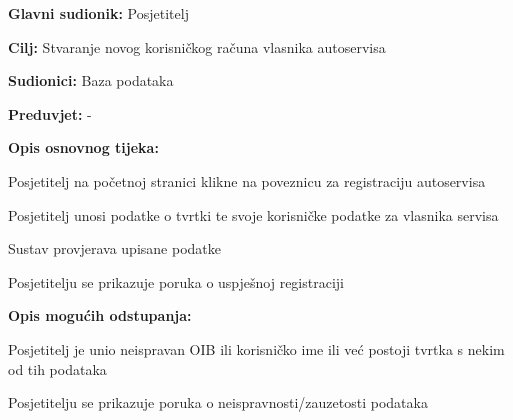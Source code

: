 					\noindent {}
					\begin{packed_item}
						
						\item \textbf{Glavni sudionik: } Posjetitelj
						\item  \textbf{Cilj:} Stvaranje novog korisničkog računa vlasnika autoservisa
						\item  \textbf{Sudionici:} Baza podataka
						\item  \textbf{Preduvjet:} -
						\item  \textbf{Opis osnovnog tijeka:}
						
						\item[] \begin{packed_enum}
							
							\item Posjetitelj na početnoj stranici klikne na poveznicu za registraciju autoservisa
							\item Posjetitelj unosi podatke o tvrtki te svoje korisničke podatke za vlasnika servisa
							\item Sustav provjerava upisane podatke
							\item Posjetitelju se prikazuje poruka o uspješnoj registraciji
						\end{packed_enum}
						
						\item  \textbf{Opis mogućih odstupanja:}
						
						\item[] \begin{packed_item}
							
							\item[3.a] Posjetitelj je unio neispravan OIB ili korisničko ime ili već postoji tvrtka s nekim od tih podataka
							\item[] \begin{packed_enum}
								
								\item Posjetitelju se prikazuje poruka o neispravnosti/zauzetosti podataka
								
							\end{packed_enum}
							
						\end{packed_item}
					\end{packed_item}
				
